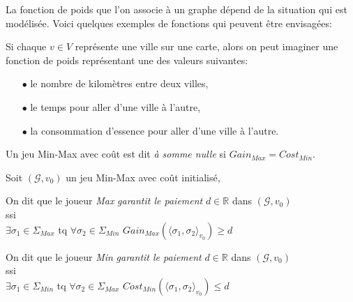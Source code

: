La fonction de poids que l'on associe à un graphe dépend de la situation qui est modélisée. Voici quelques exemples de fonctions qui peuvent être envisagées:
\begin{exemple}
	Si chaque $v \in V$ représente une ville sur une carte, alors on peut imaginer une fonction de poids représentant une des valeurs suivantes:
	\begin{enumerate}
		\item [$\bullet$] le nombre de kilomètres entre deux villes,
		\item [$\bullet$] le temps pour aller d'une ville à l'autre,
		\item [$\bullet$] la consommation d'essence pour aller d'une ville à l'autre.
	\end{enumerate}
\end{exemple}



\begin{defi}
	Un jeu Min-Max avec coût est dit \textit{à somme nulle} si $Gain_{Max} = Cost_{Min}$.
\end{defi}


\begin{defi}$\text{}$\\
	
	Soit $(\mathcal{G}, v_{0})$ un jeu Min-Max avec coût initialisé,
	
	\begin{center}On dit que le joueur \textit{Max} \textit{garantit le paiement} $d \in \mathbb{R}$ dans $(\mathcal{G}, v_{0})$\\ 
		ssi \\ 
	$\exists \sigma _{1} \in \Sigma _{Max}$ tq $\forall \sigma _{2} \in \Sigma _{Min}$ $ Gain_{Max}(\langle \sigma _{1},\sigma _{2} \rangle_{v_0}) \geq d$\\
\end{center}
	
	\begin{center} 
		On dit que le joueur \textit{Min} \textit{garantit le paiement} $d \in \mathbb{R}$ dans $(\mathcal{G}, v_{0})$\\		
		ssi	\\
		$\exists \sigma _{1}\in \Sigma _{Min}$ tq $\forall \sigma _{2} \in \Sigma _{Max}$ $ Cost_{Min}(\langle \sigma _{1},\sigma _{2}\rangle_{v_0}) \leq d$ \\
		\end{center}

\end{defi}
		

